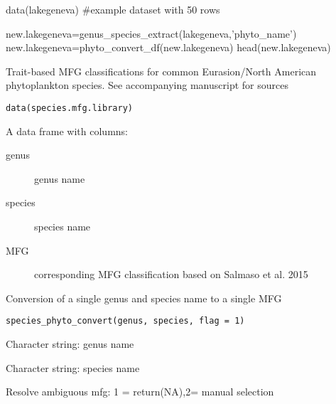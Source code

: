 \documentclass[a4paper]{book}
\begin{document}
%
\begin{Examples}
\begin{ExampleCode}
data(lakegeneva)
#example dataset with 50 rows

new.lakegeneva=genus_species_extract(lakegeneva,'phyto_name')
new.lakegeneva=phyto_convert_df(new.lakegeneva)
head(new.lakegeneva)
\end{ExampleCode}
\end{Examples}
%
\begin{Description}\relax
Trait-based MFG classifications for common Eurasion/North American phytoplankton species.
See accompanying manuscript for sources
\end{Description}
%
\begin{Usage}
\begin{verbatim}
data(species.mfg.library)
\end{verbatim}
\end{Usage}
%
\begin{Format}
A data frame with columns:
\begin{description}

\item[genus] genus name
\item[species] species name
\item[MFG] corresponding MFG classification based on Salmaso et al. 2015

\end{description}
\end{Format}
%
\begin{Description}\relax
Conversion of a single genus and species name to a single MFG
\end{Description}
%
\begin{Usage}
\begin{verbatim}
species_phyto_convert(genus, species, flag = 1)
\end{verbatim}
\end{Usage}
%
\begin{Arguments}
\begin{ldescription}
\item[\code{genus}] Character string: genus name

\item[\code{species}] Character string: species name

\item[\code{flag}] Resolve ambiguous mfg: 1 = return(NA),2= manual selection
\end{ldescription}
\end{Arguments}
\end{document}
